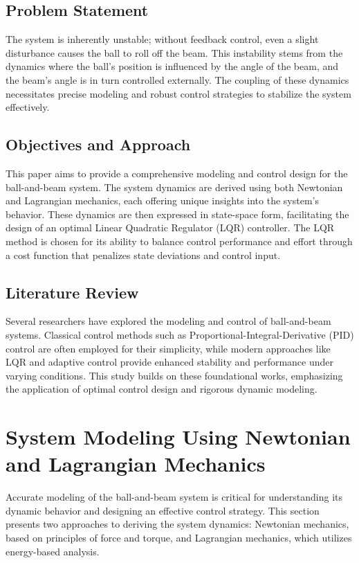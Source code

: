 \documentclass[conference]{IEEEtran}
\begin{document}
\subsection{Problem Statement}
\label{subsec:intro_prob_statement}
The system is inherently unstable; without feedback control, even a slight disturbance causes the ball to roll off the beam. This instability stems from the dynamics where the ball's position is influenced by the angle of the beam, and the beam's angle is in turn controlled externally. The coupling of these dynamics necessitates precise modeling and robust control strategies to stabilize the system effectively.

\subsection{Objectives and Approach}
\label{subsec:intro_objective}
This paper aims to provide a comprehensive modeling and control design for the ball-and-beam system. The system dynamics are derived using both Newtonian and Lagrangian mechanics, each offering unique insights into the system's behavior. These dynamics are then expressed in state-space form, facilitating the design of an optimal Linear Quadratic Regulator (LQR) controller. The LQR method is chosen for its ability to balance control performance and effort through a cost function that penalizes state deviations and control input.

\subsection{Literature Review}
\label{subsec:intro:lit_review}
Several researchers have explored the modeling and control of ball-and-beam systems. Classical control methods such as Proportional-Integral-Derivative (PID) control are often employed for their simplicity, while modern approaches like LQR and adaptive control provide enhanced stability and performance under varying conditions. This study builds on these foundational works, emphasizing the application of optimal control design and rigorous dynamic modeling.

\section{System Modeling Using Newtonian and Lagrangian Mechanics}
\label{sec:modeling}
Accurate modeling of the ball-and-beam system is critical for understanding its dynamic behavior and designing an effective control strategy. This section presents two approaches to deriving the system dynamics: Newtonian mechanics, based on principles of force and torque, and Lagrangian mechanics, which utilizes energy-based analysis.
\end{document}
